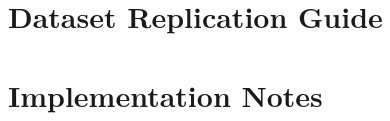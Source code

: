 \label{app:b}

\section{Dataset Replication Guide}
\label{app:b-data}

\section{Implementation Notes}
\label{app:b-impl}
